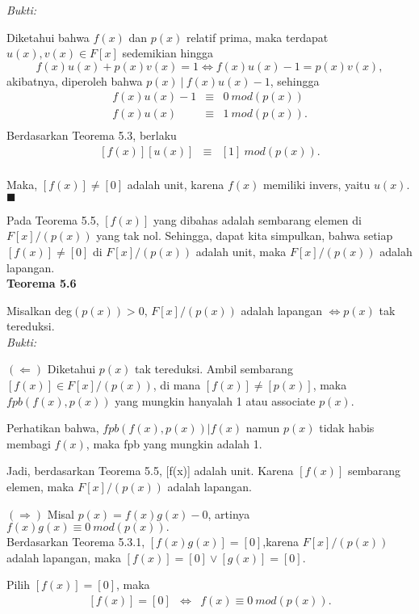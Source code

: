 	\textit{Bukti:}
\par 	Diketahui bahwa $f(x)$ dan $p(x)$ relatif prima, maka terdapat $u(x),v(x) \in F[x]$ sedemikian hingga $$f(x)u(x)+p(x)v(x) =1 \iff f(x)u(x) -1 = p(x)v(x),$$
	akibatnya, diperoleh bahwa $p(x)~|~f(x)u(x)-1$, sehingga
	$$\begin{array}{rcl}
	f(x)u(x)-1 &\equiv& 0 ~mod(p(x))\\
	f(x)u(x) &\equiv& 1~mod(p(x)).\\
	\end{array}$$
	Berdasarkan Teorema 5.3, berlaku
	$$\begin{array}{rcl}
	[f(x)][u(x)]&\equiv& [1] ~mod(p(x)).\\
	\end{array}$$
\par 	Maka, $[f(x)] \ne [0]$ adalah unit, karena $f(x)$ memiliki invers, yaitu $u(x).$ $\blacksquare$
\\
\par 	Pada Teorema 5.5, $[f(x)]$ yang dibahas adalah sembarang elemen di $F[x]/(p(x))$ yang tak nol. Sehingga, dapat kita simpulkan, bahwa setiap $[f(x)] \ne [0]$ di $F[x]/(p(x))$ adalah unit, maka $F[x]/(p(x))$ adalah lapangan.
\\
\newpage
	\textbf{Teorema 5.6}
\par 	Misalkan deg$(p(x))>0$, $F[x]/(p(x))$ adalah lapangan $\iff p(x)$ tak tereduksi.
\\
	\textit{Bukti:}
\par 	$(\Leftarrow)$ Diketahui $p(x)$ tak tereduksi. Ambil sembarang $[f(x)] \in F[x]/(p(x))$, di mana $[f(x)] \ne [p(x)]$, maka $ fpb(f(x),p(x))$ yang mungkin hanyalah 1 atau associate $p(x).$
\par 	Perhatikan bahwa, $fpb(f(x),p(x))|f(x)$ namun $p(x)$ tidak habis membagi $f(x)$, maka fpb yang mungkin adalah 1. 
\par 	Jadi, berdasarkan Teorema 5.5, [f(x)] adalah unit. Karena $[f(x)]$ sembarang elemen, maka $F[x]/(p(x))$ adalah lapangan.
\\
\par 	$(\Rightarrow)$  Misal $p(x)=f(x)g(x) - 0$, artinya $f(x)g(x) \equiv 0~mod(p(x)).$ \\
	Berdasarkan Teorema 5.3.1, $[f(x)g(x)]=[0]$,karena $F[x]/(p(x))$ adalah lapangan,  maka $[f(x)] = [0] \vee [g(x)] = [0].$
\par 	Pilih $[f(x)] = [0]$, maka
	$$\begin{array}{rcl}
	[f(x)] = [0] &\iff& f(x) \equiv 0~mod(p(x)).\\
	\end{array}$$
